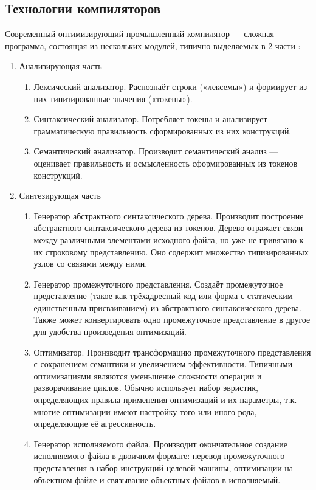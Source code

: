 \subsection{Технологии компиляторов}
Современный оптимизирующий промышленный компилятор --- сложная программа, состоящая из нескольких модулей, типично выделяемых в 2 части \cite{Aho:2006:CPT:1177220}:
\begin{enumerate}
	\item Анализирующая часть
	\begin{enumerate}
		\item Лексический анализатор. Распознаёт строки («лексемы») и формирует из них типизированные значения («токены»).
		\item Синтаксический анализатор. Потребляет токены и анализирует грамматическую правильность сформированных из них конструкций.
		\item Семантический анализатор. Производит семантический анализ --- оценивает правильность и осмысленность сформированных из токенов конструкций.
	\end{enumerate}
	\item Синтезирующая часть
	\begin{enumerate}
		\item Генератор абстрактного синтаксического дерева. Производит построение абстрактного синтаксического дерева из токенов. Дерево отражает связи между различными элементами исходного файла, но уже не привязано к их строковому представлению. Оно содержит множество типизированных узлов со связями между ними.
		\item Генератор промежуточного представления. Создаёт промежуточное представление (такое как трёхадресный код или форма с статическим единственным присваиванием) из абстрактного синтаксического дерева. Также может конвертировать одно промежуточное представление в другое для удобства произведения оптимизаций.
		\item Оптимизатор. Производит трансформацию промежуточного представления с сохранением семантики и увеличением эффективности. Типичными оптимизациями являются уменьшение сложности операции и разворачивание циклов. Обычно использует набор эвристик, определяющих правила применения оптимизаций и их параметры, т.к. многие оптимизации имеют настройку того или иного рода, определяющие её агрессивность.
		\item Генератор исполняемого файла. Производит окончательное создание исполняемого файла в двоичном формате: перевод промежуточного представления в набор инструкций целевой машины, оптимизации на объектном файле и связывание объектных файлов в исполняемый.
	\end{enumerate}
\end{enumerate}

